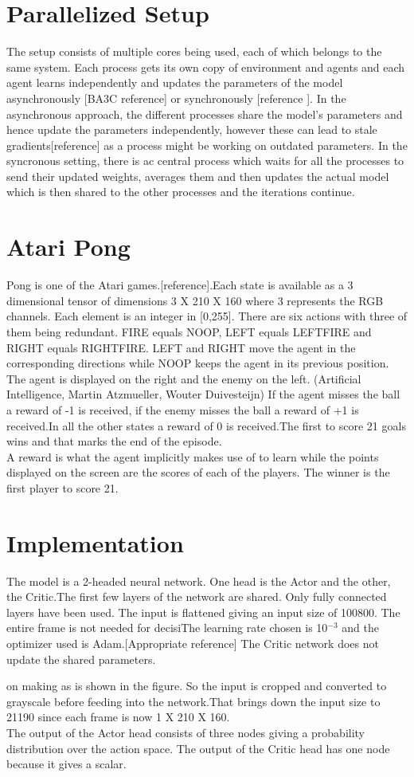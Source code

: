 \documentclass[12pt,a4paper]{article}
\begin{document}
\section*{Parallelized Setup}
The setup consists of multiple cores being used, each of which belongs to the same system. Each process gets its own copy of environment and agents and each agent learns independently and updates the parameters of the model asynchronously [BA3C reference] or synchronously [reference ]. In the asynchronous approach, the different processes share the model's parameters and hence update the parameters independently, however these can lead to stale gradients[reference] as a process might be working on outdated parameters. In the syncronous setting, there is ac central process which waits for all the processes to send their updated weights, averages them and then  updates the actual model which is then shared to the other processes and the iterations continue.

\section*{Atari Pong}
Pong is one of the Atari games.[reference].Each state is available as a 3 dimensional tensor of dimensions  3 X 210 X 160 where 3 represents the RGB channels. Each element is an integer in [0,255]. There are six actions with three of them being redundant. FIRE equals NOOP, LEFT equals LEFTFIRE and RIGHT equals RIGHTFIRE. LEFT and RIGHT move the agent in the corresponding directions while NOOP keeps the agent in its previous position. The agent is displayed on the right and the enemy on the left. (Artificial Intelligence, Martin Atzmueller, Wouter Duivesteijn) If the agent misses the ball a reward of -1 is received, if the enemy misses the ball a reward of +1 is received.In all the other states a reward of 0 is received.The first to score 21 goals wins and that marks the end of the episode.\\
A reward is what the agent implicitly makes use of to learn while the points displayed on the screen are the scores of each of the players. The winner is the first player to score 21.

\section*{Implementation}
The model is a 2-headed neural network. One head is the Actor and the other, the Critic.The first few layers of the network are shared. Only fully connected layers have been used. The input is flattened giving an input size of 100800. The entire frame is not needed for decisiThe learning rate chosen is 10\(^{-3}\) and the optimizer used is Adam.[Appropriate reference] The Critic network does not update the shared parameters.


on making as is shown in the figure. So the input is cropped and converted to grayscale before feeding into the network.That brings down the input size to 21190 since each frame is now 1 X 210 X 160.\\
The output of the Actor head consists of three nodes giving a probability distribution over the action space. The output of the Critic head has one node because it gives a scalar. 
\end{document}
